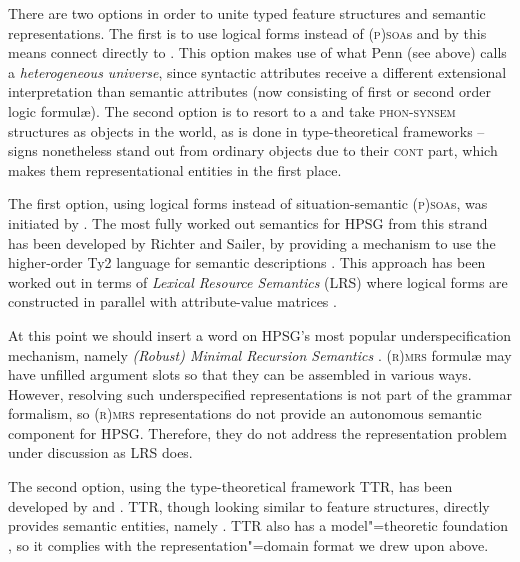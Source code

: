 \documentclass[output=paper
 	        ,biblatex
                ,babelshorthands
                ,newtxmath
                ,draftmode
                ,colorlinks, citecolor=brown
]{langscibook}
\begin{document}
There are two options in order to unite typed feature structures and semantic representations.
%
The first is to use logical forms  instead of \textsc{(p)soa}s and by this means connect directly to .
%
This option makes use of what Penn (see above) calls a \emph{heterogeneous universe},  since syntactic attributes receive a different extensional interpretation than  semantic attributes (now consisting of first or second order logic formul{\ae}).
%
The second option is to resort to a  and take \textsc{phon-synsem} structures as objects in the world, as is done in type-theoretical frameworks  -- signs nonetheless stand out from ordinary objects due to their \textsc{cont} part, which makes them representational entities in the first place.



The first option, using logical forms instead of situation-semantic \textsc{(p)soa}s, was initiated by \citet{Nerbonne:1992}. 
%
The most fully worked out semantics for HPSG from this strand has been developed by Richter and Sailer, by providing a mechanism to use the higher-order Ty2 language for semantic descriptions \citep{Richter:Sailer:1999:a}.
%
This approach has been worked out in terms of \emph{Lexical Resource Semantics} (LRS)  %
where logical forms are constructed in parallel with attribute-value matrices \citep{Richter:Sailer:04}.


At this point we should insert a word on HPSG's most popular underspecification mechanism, namely \emph{(Robust) Minimal Recursion Semantics}  \citep*{Copestake:Flickinger:Pollard:Sag:2005,Copestake:2007}.
%
\textsc{(r)mrs} formul{\ae} may have unfilled argument slots so that they can be assembled in various ways.
%
However, resolving such underspecified representations is not part of the grammar formalism, so \textsc{(r)mrs} representations do not provide an autonomous semantic component for HPSG.
%
Therefore, they do not address the representation problem under discussion as LRS does. 


The second option, using the type-theoretical framework  TTR, has been developed by \citet{Cooper:2008,Cooper:2014:a,Cooper:ms} and \citet{Ginzburg:2012}.
%
TTR, though looking similar to feature structures, directly provides semantic entities, namely  \citep[Sec.~5.2.2]{Ginzburg:2012}.
%
TTR also has a model"=theoretic foundation \citep{Cooper:ms}, so it complies with the representation"=domain format we drew upon above.
\end{document}
